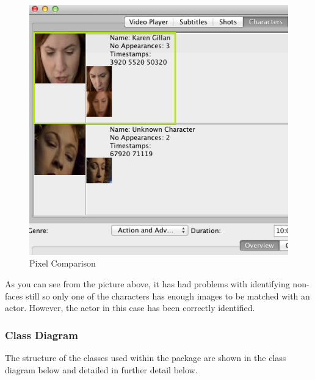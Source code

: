 \begin{figure}[ht]
\begin{center}
 \includegraphics[trim = 0mm 0mm 0mm 0mm, clip,
 scale=0.64]{Images/ActorMatching.png}
  \caption{Pixel Comparison}
 \end{center}
\end{figure}

As you can see from the picture above, it has had problems with identifying non-faces still so only one of the characters has enough images to be matched with an actor. However, the actor in this case has been correctly identified.

\newpage

\subsubsection{Class Diagram}
The structure of the classes used within the package are shown in the class diagram below and detailed in further detail below.

